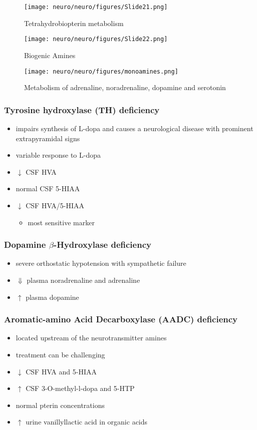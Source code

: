 \documentclass{scrartcl}
\begin{document}
\begin{figure}[htbp]
\centering
\texttt{[image: neuro/neuro/figures/Slide21.png]}
\caption{\label{fig:org43b04d0}Tetrahydrobiopterin metabolism}
\end{figure}

\begin{figure}[htbp]
\centering
\texttt{[image: neuro/neuro/figures/Slide22.png]}
\caption{\label{fig:orgb3221c5}Biogenic Amines}
\end{figure}

\begin{figure}[htbp]
\centering
\texttt{[image: neuro/neuro/figures/monoamines.png]}
\caption{\label{fig:orgf55f215}Metabolism of adrenaline, noradrenaline, dopamine and serotonin}
\end{figure}


\subsubsection{Tyrosine hydroxylase (TH) deficiency}
\label{sec:orgc2408bb}
\begin{itemize}
\item impairs synthesis of L-dopa and causes a neurological disease with
prominent extrapyramidal signs
\item variable response to L-dopa
\item \(\downarrow\) CSF HVA
\item normal CSF 5-HIAA
\item \(\downarrow\) CSF HVA/5-HIAA
\begin{itemize}
\item most sensitive marker
\end{itemize}
\end{itemize}
\subsubsection{Dopamine \(\beta\)-Hydroxylase deficiency}
\label{sec:orgc66165a}
\begin{itemize}
\item severe orthostatic hypotension with sympathetic failure
\item \(\Downarrow\) plasma noradrenaline and adrenaline
\item \(\uparrow\) plasma dopamine
\end{itemize}
\subsubsection{Aromatic-amino Acid Decarboxylase (AADC) deficiency}
\label{sec:org982c4f9}
\begin{itemize}
\item located upstream of the neurotransmitter amines
\item treatment can be challenging
\item \(\downarrow\) CSF HVA and 5-HIAA
\item \(\uparrow\) CSF 3-O-methyl-l-dopa and 5-HTP
\item normal pterin concentrations
\item \(\uparrow\) urine vanillyllactic acid in organic acids
\end{itemize}
\end{document}
